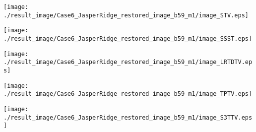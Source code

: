 \begin{figure*}[t]
\begin{center}
        \begin{minipage}{0.150\hsize}
            \centerline{\hspace{\hsize}} %
		\end{minipage}
        \begin{minipage}{0.150\hsize}
            \centerline{\texttt{[image: ./result\_image/Case6\_JasperRidge\_restored\_image\_b59\_m1/image\_STV.eps]}} %
        \end{minipage}
        \begin{minipage}{0.150\hsize}
            \centerline{\texttt{[image: ./result\_image/Case6\_JasperRidge\_restored\_image\_b59\_m1/image\_SSST.eps]}} %
        \end{minipage}
        \begin{minipage}{0.150\hsize}
            \centerline{\texttt{[image: ./result\_image/Case6\_JasperRidge\_restored\_image\_b59\_m1/image\_LRTDTV.eps]}} %
        \end{minipage}
        \begin{minipage}{0.150\hsize}
            \centerline{\texttt{[image: ./result\_image/Case6\_JasperRidge\_restored\_image\_b59\_m1/image\_TPTV.eps]}} %
        \end{minipage}
        \begin{minipage}{0.150\hsize}
            \centerline{\texttt{[image: ./result\_image/Case6\_JasperRidge\_restored\_image\_b59\_m1/image\_S3TTV.eps]}} %
        \end{minipage}
        \begin{minipage}{0.055\hsize}
            \centerline{\hspace{\hsize}} %
		\end{minipage}
        
        \vspace{1mm}


\end{center}
\end{figure*}
